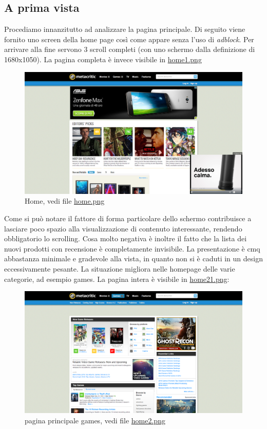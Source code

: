 \documentclass[12pt]{article}
\begin{document}
\subsection{A prima vista}
Procediamo innanzitutto ad analizzare la pagina principale. Di seguito viene fornito uno screen della home page così come appare senza l'uso di \textit{adblock}. Per arrivare alla fine servono 3 scroll completi (con uno schermo dalla definizione di 1680x1050). La pagina completa è invece visibile in \href{home1.png}{home1.png}
\begin{figure}[H]
\begin{center}
\includegraphics[width=13.5cm]{home.png}
\caption{Home, vedi file \href{home.png}{home.png}}
\end{center}
\end{figure}
Come si può notare il fattore di forma particolare dello schermo contribuisce a lasciare poco spazio alla visualizzazione di contenuto interessante, rendendo obbligatorio lo scrolling. Cosa molto negativa è inoltre il fatto che la lista dei nuovi prodotti con recensione è completamente invisibile.
La presentazione è cmq abbastanza minimale e gradevole alla vista, in quanto non si è caduti in un design eccessivamente pesante.
La situazione migliora nelle homepage delle varie categorie, ad esempio games. La pagina intera è visibile in \href{home21.png}{home21.png}:
\begin{figure}[H]
	\begin{center}
		\includegraphics[width=13.5cm]{home2.png}
		\caption{pagina principale games, vedi file \href{home2.png}{home2.png}}
	\end{center}
\end{figure}
\end{document}
